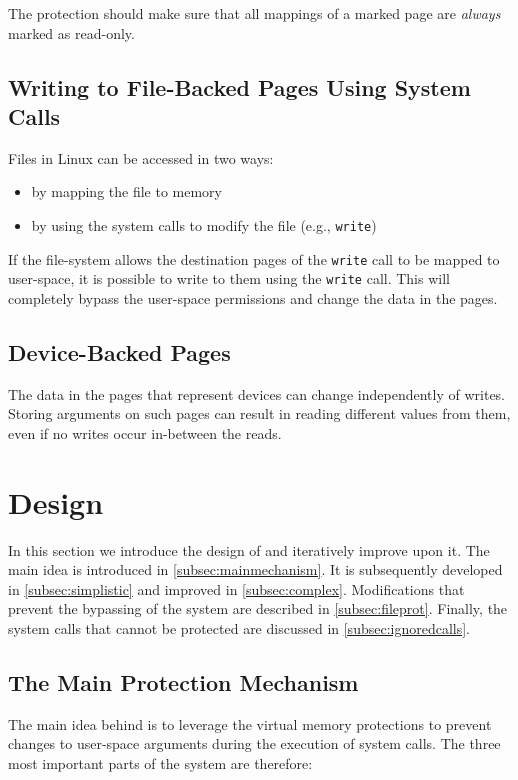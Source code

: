 The protection should make sure that all mappings of a marked page are \emph{always}
marked as read-only.

\subsection{Writing to File-Backed Pages Using System Calls}

Files in Linux can be accessed in two ways:
\begin{itemize}
    \item by mapping the file to memory
    \item by using the system calls to modify the file (e.g., \texttt{write})
\end{itemize}

If the file-system allows the destination pages of the \texttt{write} call to be
mapped to user-space, it is possible to write to them using the \texttt{write}
call. This will completely bypass the user-space permissions and change the data
in the pages.

\subsection{Device-Backed Pages}

The data in the pages that represent devices can change independently of writes.
Storing arguments on such pages can result in reading different values from them,
even if no writes occur in-between the reads.

\section{Design}
\label{sec:design}

In this section we introduce the design of \sysname and iteratively improve upon
it. The main idea is introduced in \autoref{subsec:mainmechanism}. It is
subsequently developed in \autoref{subsec:simplistic} and improved in \autoref{subsec:complex}.
Modifications that prevent the bypassing of the system are described in \autoref{subsec:fileprot}.
Finally, the system calls that cannot be protected are discussed in \autoref{subsec:ignoredcalls}.

\subsection{The Main Protection Mechanism}
\label{subsec:mainmechanism}

The main idea behind \sysname is to leverage the virtual memory protections to
prevent changes to user-space arguments during the execution of system calls.
The three most important parts of the system are therefore:

